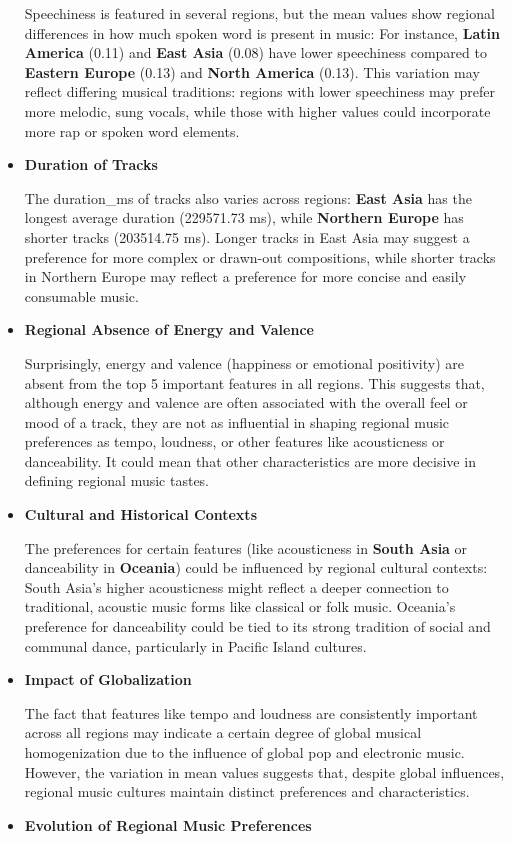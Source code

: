 \begin{itemize}
Speechiness is featured in several regions, but the mean values show regional differences in how much spoken word is present in music:
For instance, \textbf{Latin America} (0.11) and \textbf{East Asia} (0.08) have lower speechiness compared to \textbf{Eastern Europe} (0.13) and \textbf{North America} (0.13).
This variation may reflect differing musical traditions: regions with lower speechiness may prefer more melodic, sung vocals, while those with higher values could incorporate more rap or spoken word elements.
\item\textbf{Duration of Tracks}

The duration\_ms of tracks also varies across regions:
\textbf{East Asia} has the longest average duration (229571.73 ms), while \textbf{Northern Europe} has shorter tracks (203514.75 ms).
Longer tracks in East Asia may suggest a preference for more complex or drawn-out compositions, while shorter tracks in Northern Europe may reflect a preference for more concise and easily consumable music.
\item\textbf{Regional Absence of Energy and Valence}

Surprisingly, energy and valence (happiness or emotional positivity) are absent from the top 5 important features in all regions.
This suggests that, although energy and valence are often associated with the overall feel or mood of a track, they are not as influential in shaping regional music preferences as tempo, loudness, or other features like acousticness or danceability. It could mean that other characteristics are more decisive in defining regional music tastes.
\item\textbf{Cultural and Historical Contexts}

The preferences for certain features (like acousticness in \textbf{South Asia} or danceability in \textbf{Oceania}) could be influenced by regional cultural contexts:
South Asia's higher acousticness might reflect a deeper connection to traditional, acoustic music forms like classical or folk music.
Oceania’s preference for danceability could be tied to its strong tradition of social and communal dance, particularly in Pacific Island cultures.
\item\textbf{Impact of Globalization}

The fact that features like tempo and loudness are consistently important across all regions may indicate a certain degree of global musical homogenization due to the influence of global pop and electronic music.
However, the variation in mean values suggests that, despite global influences, regional music cultures maintain distinct preferences and characteristics.
\item\textbf{Evolution of Regional Music Preferences}


\end{itemize}
